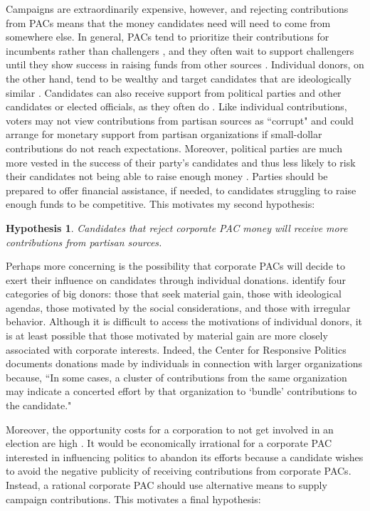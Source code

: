 \documentclass[12pt]{article}
\newtheorem{hyp}{Hypothesis}
\begin{document}
 Campaigns are extraordinarily expensive, however, and rejecting contributions from PACs means that the money candidates need will need to come from somewhere else. In general, PACs tend to prioritize their contributions for incumbents rather than challengers \citep{brunell2005}, and they often wait to support challengers until they show success in raising funds from other sources \citep{biersack1993}. Individual donors, on the other hand, tend to be wealthy \citep{brown1995} and target candidates that are ideologically similar \citep{bonica2014}. Candidates can also receive support from political parties and other candidates or elected officials, as they often do \citep{wilcox1989, currinder2003}. Like individual contributions, voters may not view contributions from partisan sources as ``corrupt" and could arrange for monetary support from partisan organizations if small-dollar contributions do not reach expectations. Moreover, political parties are much more vested in the success of their party's candidates and thus less likely to risk their candidates not being able to raise enough money \citep{herrnson2009}. Parties should be prepared to offer financial assistance, if needed, to candidates struggling to raise enough funds to be competitive. This motivates my second hypothesis:
 
 \begin{hyp}
     Candidates that reject corporate PAC money will receive more contributions from partisan sources.  
 \end{hyp}
 
Perhaps more concerning is the possibility that corporate PACs will decide to exert their influence on candidates through individual donations. \citet{francia2003} identify four categories of big donors: those that seek material gain, those with ideological agendas, those motivated by the social considerations, and those with irregular behavior. Although it is difficult to access the motivations of individual donors, it is at least possible that those motivated by material gain are more closely associated with corporate interests. Indeed, the Center for Responsive Politics documents donations made by individuals in connection with larger organizations because, ``In some cases, a cluster of contributions from the same organization may indicate a concerted effort by that organization to `bundle' contributions to the candidate." 

Moreover, the opportunity costs for a corporation to not get involved in an election are high \citep{denzau1986, grier1986, kroszner1998}. It would be economically irrational for a corporate PAC interested in influencing politics to abandon its efforts because a candidate wishes to avoid the negative publicity of receiving contributions from corporate PACs. Instead, a rational corporate PAC should use alternative means to supply campaign contributions. This motivates a final hypothesis:
 
\end{document}
